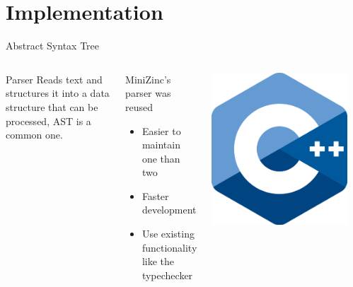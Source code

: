 \documentclass[aspectratio=169]{beamer} %
\begin{document}
\section{Implementation}
\begin{frame}{Abstract Syntax Tree}
  \begin{columns}
  \begin{block}{Parser}
    Reads text and structures it into a data structure that can be processed, AST is a common one.
  \end{block}

  \pause
  \begin{block}{MiniZinc's parser was reused}
    \begin{itemize}
      \item Easier to maintain one than two
      \item Faster development
      \item Use existing functionality like the typechecker
    \end{itemize}
  \end{block}

  \pause
  \begin{center}
    \includegraphics[width=0.9\textwidth]{cpp.png}
  \end{center}
  \end{columns}
\end{frame}
\end{document}
